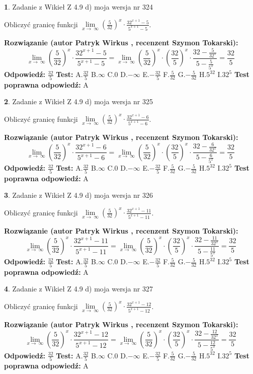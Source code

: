 \documentclass[12pt, a4paper]{article}
\theoremstyle{definition} %
\newtheorem{zad}{}
\newcommand{\zadStart}[1]{\begin{zad}#1\newline}
\newcommand{\zadStop}{\end{zad}}
\newcommand{\rozwStart}[2]{\noindent \textbf{Rozwiązanie (autor #1 , recenzent #2): }\newline}
\newcommand{\rozwStop}{\newline}
\newcommand{\odpStart}{\noindent \textbf{Odpowiedź:}\newline}
\newcommand{\odpStop}{\newline}
\newcommand{\testStart}{\noindent \textbf{Test:}\newline}
\newcommand{\testStop}{\newline}
\newcommand{\kluczStart}{\noindent \textbf{Test poprawna odpowiedź:}\newline}
\newcommand{\kluczStop}{\newline}
\begin{document}
\zadStart{Zadanie z Wikieł Z 4.9 d) moja wersja nr 324}


Obliczyć granicę funkcji  $\lim\limits_{x\to\ \infty}(\frac{5}{32})^{x}\cdot\frac{32^{x+1}-5}{5^{x+1}-5}$.
\zadStop
\rozwStart{Patryk Wirkus}{Szymon Tokarski}
$$\lim\limits_{x\to\ \infty}(\frac{5}{32})^{x}\cdot\frac{32^{x+1}-5}{5^{x+1}-5}=\lim\limits_{x\to\ \infty}(\frac{5}{32})^{x}\cdot(\frac{32}{5})^{x} \cdot \frac{32-\frac{5}{32^{x}}}{5-\frac{5}{5^{x}}} = \frac{32}{5}$$
\rozwStop
\odpStart
$\frac{32}{5}$
\odpStop
\testStart
A.$\frac{32}{5}$ B.$\infty$ C.$0$ D.$-\infty$ E.$-\frac{32}{5}$
F.$\frac{5}{32}$ G.$-\frac{5}{32}$
H.$5^{32}$
I.$32^{5}$
\testStop
\kluczStart
A
\kluczStop



\zadStart{Zadanie z Wikieł Z 4.9 d) moja wersja nr 325}


Obliczyć granicę funkcji  $\lim\limits_{x\to\ \infty}(\frac{5}{32})^{x}\cdot\frac{32^{x+1}-6}{5^{x+1}-6}$.
\zadStop
\rozwStart{Patryk Wirkus}{Szymon Tokarski}
$$\lim\limits_{x\to\ \infty}(\frac{5}{32})^{x}\cdot\frac{32^{x+1}-6}{5^{x+1}-6}=\lim\limits_{x\to\ \infty}(\frac{5}{32})^{x}\cdot(\frac{32}{5})^{x} \cdot \frac{32-\frac{6}{32^{x}}}{5-\frac{6}{5^{x}}} = \frac{32}{5}$$
\rozwStop
\odpStart
$\frac{32}{5}$
\odpStop
\testStart
A.$\frac{32}{5}$ B.$\infty$ C.$0$ D.$-\infty$ E.$-\frac{32}{5}$
F.$\frac{5}{32}$ G.$-\frac{5}{32}$
H.$5^{32}$
I.$32^{5}$
\testStop
\kluczStart
A
\kluczStop



\zadStart{Zadanie z Wikieł Z 4.9 d) moja wersja nr 326}


Obliczyć granicę funkcji  $\lim\limits_{x\to\ \infty}(\frac{5}{32})^{x}\cdot\frac{32^{x+1}-11}{5^{x+1}-11}$.
\zadStop
\rozwStart{Patryk Wirkus}{Szymon Tokarski}
$$\lim\limits_{x\to\ \infty}(\frac{5}{32})^{x}\cdot\frac{32^{x+1}-11}{5^{x+1}-11}=\lim\limits_{x\to\ \infty}(\frac{5}{32})^{x}\cdot(\frac{32}{5})^{x} \cdot \frac{32-\frac{11}{32^{x}}}{5-\frac{11}{5^{x}}} = \frac{32}{5}$$
\rozwStop
\odpStart
$\frac{32}{5}$
\odpStop
\testStart
A.$\frac{32}{5}$ B.$\infty$ C.$0$ D.$-\infty$ E.$-\frac{32}{5}$
F.$\frac{5}{32}$ G.$-\frac{5}{32}$
H.$5^{32}$
I.$32^{5}$
\testStop
\kluczStart
A
\kluczStop



\zadStart{Zadanie z Wikieł Z 4.9 d) moja wersja nr 327}


Obliczyć granicę funkcji  $\lim\limits_{x\to\ \infty}(\frac{5}{32})^{x}\cdot\frac{32^{x+1}-12}{5^{x+1}-12}$.
\zadStop
\rozwStart{Patryk Wirkus}{Szymon Tokarski}
$$\lim\limits_{x\to\ \infty}(\frac{5}{32})^{x}\cdot\frac{32^{x+1}-12}{5^{x+1}-12}=\lim\limits_{x\to\ \infty}(\frac{5}{32})^{x}\cdot(\frac{32}{5})^{x} \cdot \frac{32-\frac{12}{32^{x}}}{5-\frac{12}{5^{x}}} = \frac{32}{5}$$
\rozwStop
\odpStart
$\frac{32}{5}$
\odpStop
\testStart
A.$\frac{32}{5}$ B.$\infty$ C.$0$ D.$-\infty$ E.$-\frac{32}{5}$
F.$\frac{5}{32}$ G.$-\frac{5}{32}$
H.$5^{32}$
I.$32^{5}$
\testStop
\kluczStart
A
\kluczStop
\end{document}
